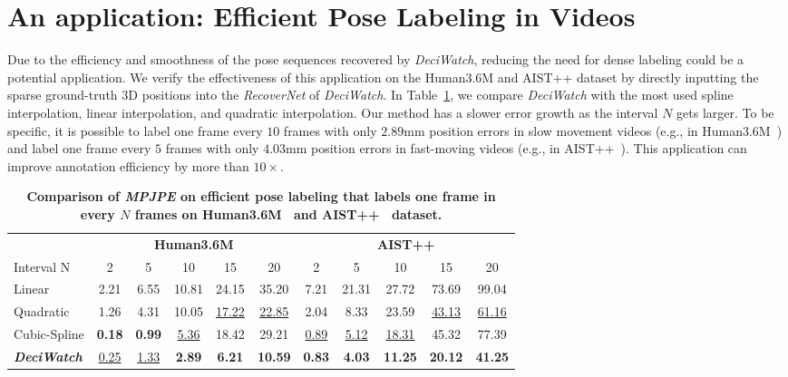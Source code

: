 \documentclass[runningheads]{llncs}
\newcommand{\name}{\emph{DeciWatch}\xspace}
\begin{document}
\section{An application: Efficient Pose Labeling in Videos}
\label{sec:supp_app}
Due to the efficiency and smoothness of the pose sequences recovered by \name, reducing the need for dense labeling could be a potential application. We verify the effectiveness of this application on the Human3.6M and AIST++ dataset by directly inputting the sparse ground-truth 3D positions into the \emph{RecoverNet} of \name. In Table~\ref{tab:label}, we compare \name with the most used spline interpolation, linear interpolation, and quadratic interpolation. Our method has a slower error growth as the interval $N$ gets larger. 
To be specific, it is possible to label one frame every $10$ frames with only $2.89$mm position errors in slow movement videos (e.g., in Human3.6M~\cite{ionescu2013human3}) and label one frame every $5$ frames with only $4.03$mm position errors in fast-moving videos (e.g., in AIST++~\cite{li2021aist}). This application can improve annotation efficiency by more than $10\times$.
\begin{table}[h]
\small
	\centering
    \caption{\textbf{Comparison of \emph{MPJPE} on efficient pose labeling that labels one frame in every $N$ frames on Human3.6M~\cite{ionescu2013human3} and AIST++~\cite{li2021aist} dataset.}}
	{\begin{tabular}{l|ccccc||ccccc}

			\specialrule{.1em}{.05em}{.05em}
			&\multicolumn{5}{c||}{\cellcolor{Gray}\textbf{Human3.6M}}&\multicolumn{5}{c}{\cellcolor{Gray}\textbf{AIST++}}\\
			\cmidrule{2-11}
			Interval N&2 &  5 &10&15 &20&2 & 5 &10&15 &20\\
			\midrule
			Linear&2.21&6.55&10.81&24.15&35.20&7.21&21.31&27.72&73.69&99.04 \\
			Quadratic&1.26&4.31&10.05&\underline{17.22}&\underline{22.85}&2.04&8.33&23.59&\underline{43.13}&\underline{61.16}\\
			Cubic-Spline&\textbf{0.18}&\textbf{0.99}&\underline{5.36}&18.42&29.21&\underline{0.89}&\underline{5.12}&\underline{18.31}&45.32&77.39\\
		    \textbf{\name}& \underline{0.25}&\underline{1.33
		    }&\textbf{2.89}&\textbf{6.21}&\textbf{10.59}&\textbf{0.83}&\textbf{4.03}&\textbf{11.25}&\textbf{20.12}&\textbf{41.25}\\
        \midrule
        \end{tabular}}
	\label{tab:label}
\end{table}
\end{document}
